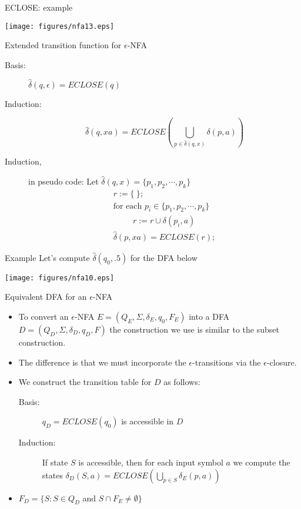 \documentclass{prosper}%
\newcommand{\egk}{\mbox{$\epsilon$}}
\newcommand{\enfa}{{$\epsilon$-NFA}}
\begin{document}
\begin{slide}{ECLOSE: example}
\begin{center}
\texttt{[image: figures/nfa13.eps]}
\end{center}
\end{slide}

\begin{slide}{Extended transition function for \enfa}
\begin{description}
\item[Basis:]
\(
\hat\delta(q, \egk)=ECLOSE(q)
\)
\item[Induction:]
\[
\hat\delta(q, xa) = ECLOSE(\bigcup_{p\in\hat\delta(q, x)}\delta(p, a))
\]
\item[\blue Induction,] in pseudo code: Let $\hat\delta(q, x)=\{p_1,p_2,\cdots,p_k\}$
\[
\begin{array}{l}
r:= \{\ \};\\
\mbox{for each } p_i\in \{p_1,p_2,\cdots,p_k\} \\
\hspace{1cm}r := r \cup \delta(p_i, a)\\
\hat\delta(p, xa)= ECLOSE(r);
\end{array}
\]
\end{description}
\end{slide}

\begin{slide}{Example}
Let's compute  $\hat{\delta}(q_0,.5)$ for the DFA below
\begin{center}
\texttt{[image: figures/nfa10.eps]}
\end{center}
\end{slide}

\begin{slide}{Equivalent DFA for an \enfa}
\begin{itemize}
\item To convert an \egk-NFA $E=(Q_E,\Sigma, \delta_E, q_0, F_E)$ into a DFA $D=(Q_D, \Sigma, \delta_D, q_D, F)$ the construction we use is similar to the subset construction.
\item The difference is that we must incorporate the \egk-transitions via the \egk-closure.
\item We construct the transition table for $D$  as follows:
\begin{description}
\item[Basis:] $q_D=ECLOSE(q_0)$ is accessible in $D$
\item[Induction:]  If state $S$ is accessible, then for each input symbol $a$ we compute the  states $\delta_D(S,a)= \displaystyle ECLOSE(\bigcup_{p\in S}\delta_E(p,a))$
\end{description}
\item $F_D = \{S : S \in Q_D$ and $S\cap F_E\neq \emptyset\}$
\end{itemize}
\end{slide}
\end{document}
